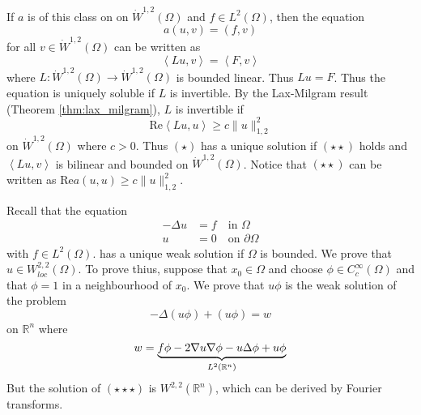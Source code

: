 \documentclass[10pt, oneside, reqno]{amsart}
\theoremstyle{plain}%
\numberwithin{equation}{section}
\theoremstyle{definition}
\theoremstyle{remark}
\newcommand{\R}{\mathbb{R}}
\newcommand{\iprod}[1]{\left\langle #1 \right\rangle}
\renewcommand{\Re}{\text{Re}}
\begin{document}
    If $a$ is of this class on on $\dot W^{1, 2}(\Omega)$ and $f \in L^2(\Omega)$, then the equation 
    \[ 
        a(u, v) = (f, v)
        \tag{$\star$}
    \] for all $v \in \dot W^{1, 2}(\Omega)$ can be written as \[
        \iprod{Lu, v} = \iprod{F, v}
    \] where $L: \dot W^{1, 2}(\Omega) \rightarrow \dot W^{1, 2}(\Omega)$ is bounded linear.  Thus $Lu = F$.  Thus the equation is uniquely soluble if $L$ is invertible.  By the Lax-Milgram result (Theorem \ref{thm:lax_milgram}), $L$ is invertible if \[
    \Re \iprod{Lu, u} \geq c \| u \|^2_{1, 2}
    \tag{$\star \star$}
    \]
    on $\dot W^{1, 2}(\Omega)$ where $c > 0$.  Thus $(\star)$ has a unique solution if $(\star \star)$ holds and $\iprod{Lu, v}$ is bilinear and bounded on $\dot W^{1, 2}(\Omega)$.  Notice that $(\star \star)$ can be written as $\Re a(u, u) \geq c \| u \|_{1, 2}^2$.  

Recall that the equation \begin{align*}
    -\Delta u &= f \quad \text{in $\Omega$}\\
        u &= 0 \quad \text{on $\partial \Omega$}
\end{align*} with $f \in L^2(\Omega)$.
has a unique weak solution if $\Omega$ is bounded.  We prove that $u \in W^{2, 2}_{loc}(\Omega)$.  To prove thius, suppose that $x_0 \in \Omega$ and choose $\phi \in C^\infty_c(\Omega)$ and that $\phi = 1$ in a neighbourhood of $x_0$.  We prove that $u \phi$ is the weak solution of the problem \[
    - \Delta (u \phi) + (u \phi) = w 
    \tag{$\star \star \star$}
\]  on $\R^n$ where \[
    w = \underbrace{f \phi - 2 \grad u \grad \phi - u \Delta \phi + u \phi}_{L^2(\R^n)}
\]  But the solution of $(\star \star \star)$ is $W^{2,2}(\R^n)$, which can be derived by Fourier transforms.  
\end{document}
